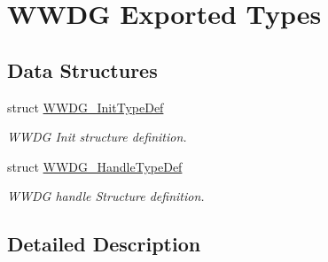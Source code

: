 \hypertarget{group___w_w_d_g___exported___types}{}\section{W\+W\+DG Exported Types}
\label{group___w_w_d_g___exported___types}
\subsection*{Data Structures}
\begin{DoxyCompactItemize}
\item 
struct \hyperlink{struct_w_w_d_g___init_type_def}{W\+W\+D\+G\+\_\+\+Init\+Type\+Def}
\begin{DoxyCompactList}\small\item\em W\+W\+DG Init structure definition. \end{DoxyCompactList}\item 
struct \hyperlink{struct_w_w_d_g___handle_type_def}{W\+W\+D\+G\+\_\+\+Handle\+Type\+Def}
\begin{DoxyCompactList}\small\item\em W\+W\+DG handle Structure definition. \end{DoxyCompactList}\end{DoxyCompactItemize}


\subsection{Detailed Description}
